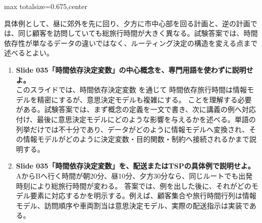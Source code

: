 \begin{adjustbox}{max totalsize={\textwidth}{0.675\textheight},center}
\begin{minipage}{\textwidth}
\begin{minipage}[t]{0.485\textwidth}
具体例として、昼に郊外を先に回り、夕方に市中心部を回る計画と、逆の計画では、同じ顧客を訪問していても総旅行時間が大きく異なる。試験答案では、時間依存性が単なるデータの違いではなく、ルーティング決定の構造を変える点まで述べるとよい。\par
{}
\begin{enumerate}
\item \textbf{Slide 035「時間依存決定変数」の中心概念を、専門用語を使わずに説明せよ。}\\このスライドでは、時間依存決定変数 を通じて 時間依存旅行時間は情報モデルを精密にするが、意思決定モデルも複雑にする。 ことを理解する必要がある。試験答案では、まず概念の定義を一文で書き、次に講義の例へ対応付け、最後に意思決定モデルにどのような影響を与えるかを述べる。単語の列挙だけでは不十分であり、データがどのように情報モデルへ変換され、その情報モデルがどのように決定変数・目的関数・制約へ接続されるかまで説明する。
\item \textbf{Slide 035「時間依存決定変数」を、配送またはTSPの具体例で説明せよ。}\\AからBへ行く時間が朝20分、昼10分、夕方30分なら、同じルートでも出発時刻により総旅行時間が変わる。 答案では、例を出した後に、それがどのモデル要素に対応するかを明示する。例えば、顧客集合や旅行時間行列は情報モデル、訪問順序や車両割当は意思決定モデル、実際の配送指示は実装である。
\end{enumerate}
\end{minipage}
\end{minipage}
\end{adjustbox}

